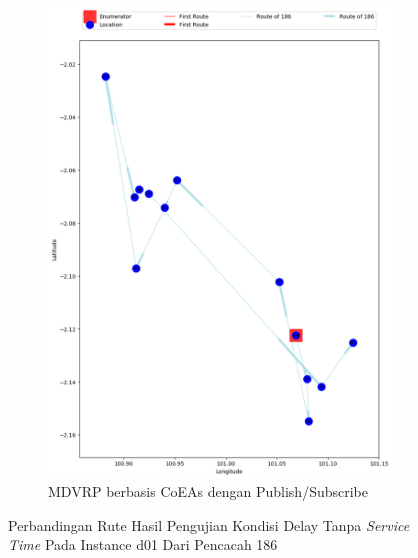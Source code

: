 \begin{figure}[H]\ContinuedFloat
	\centering
	\begin{subfigure}[t]{\textwidth}
		\centering
		\includegraphics[width=\textwidth]{Resources/Images/delayed_1/real_m15_n100_delayed_1_186_pubsub_coes}
		\caption{MDVRP berbasis CoEAs dengan Publish/Subscribe}
		\label{fig:real_m15_n100_delayed_1_186_pubsub_coes}
	\end{subfigure}
	\caption{Perbandingan Rute Hasil Pengujian Kondisi Delay Tanpa \textit{Service Time} Pada Instance d01 Dari Pencacah 186}
	\label{fig:real_m15_n100_delayed_1_186_contd}
\end{figure}


